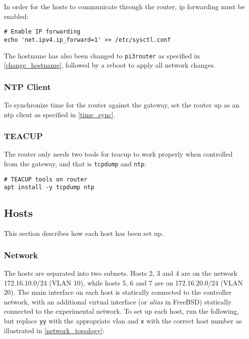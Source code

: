 In order for the hosts to communicate through the router, \gls{ip} forwarding must be enabled:

\begin{verbatim}
# Enable IP forwarding
echo 'net.ipv4.ip_forward=1' >> /etc/sysctl.conf
\end{verbatim}

The hostname has also been changed to \lstinline{pi3router} as specified in \ref{change_hostname}, followed by a reboot to apply all network changes.


\subsubsection{NTP Client}

To synchronize time for the router against the gateway, set the router up as an \gls{ntp} client as specified in \ref{time_sync}.


\subsubsection{TEACUP}

The router only needs two tools for \gls{teacup} to work properly when controlled from the gateway, and that is \lstinline{tcpdump} and \lstinline{ntp}:

\begin{verbatim}
# TEACUP tools on router
apt install -y tcpdump ntp
\end{verbatim}






\subsection{Hosts}

This section describes how each host has been set up. 


\subsubsection{Network}

The hosts are separated into two subnets. Hosts 2, 3 and 4 are on the network 172.16.10.0/24 (VLAN 10), while hosts 5, 6 and 7 are on 172.16.20.0/24 (VLAN 20). The main interface on each host is statically connected to the controller network, with an additional virtual interface (or \textit{alias} in FreeBSD) statically connected to the experimental network. To set up each host, run the following, but replace \lstinline{yy} with the appropriate \gls{vlan} and \lstinline{x} with the correct host number as illustrated in \ref{network_topology}:

